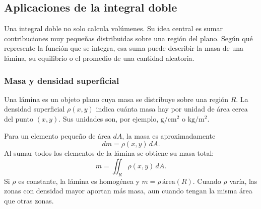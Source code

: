 \subsection{Aplicaciones de la integral doble}

Una integral doble no solo calcula volúmenes. Su idea central es sumar contribuciones muy pequeñas distribuidas sobre una región del plano. Según qué represente la función que se integra, esa suma puede describir la masa de una lámina, su equilibrio o el promedio de una cantidad aleatoria.

\subsubsection*{Masa y densidad superficial}

Una lámina es un objeto plano cuya masa se distribuye sobre una región $R$. La densidad superficial $\rho(x,y)$ indica cuánta masa hay por unidad de área cerca del punto $(x,y)$. Sus unidades son, por ejemplo, $\mathrm{g/cm^2}$ o $\mathrm{kg/m^2}$.

Para un elemento pequeño de área $dA$, la masa es aproximadamente
\[
dm=\rho(x,y)\,dA.
\]
Al sumar todos los elementos de la lámina se obtiene su masa total:
\[
m=\iint_R\rho(x,y)\,dA.
\]
Si $\rho$ es constante, la lámina es homogénea y $m=\rho\,\text{área}(R)$. Cuando $\rho$ varía, las zonas con densidad mayor aportan más masa, aun cuando tengan la misma área que otras zonas.

\begin{center}
\end{center}

